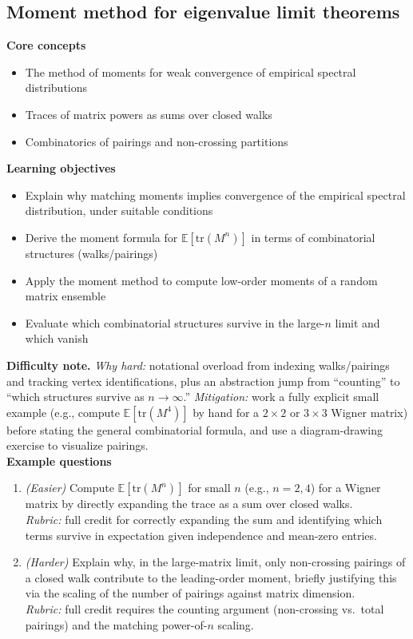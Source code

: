 \documentclass[11pt]{article}
\begin{document}
\subsection{Moment method for eigenvalue limit theorems}
\textbf{Core concepts}
\begin{itemize}[nosep]
\item The method of moments for weak convergence of empirical spectral distributions
\item Traces of matrix powers as sums over closed walks
\item Combinatorics of pairings and non-crossing partitions
\end{itemize}
\textbf{Learning objectives}
\begin{itemize}[nosep]
\item Explain why matching moments implies convergence of the empirical spectral distribution, under suitable conditions
\item Derive the moment formula for $\mathbb{E}[\mathrm{tr}(M^n)]$ in terms of combinatorial structures (walks/pairings)
\item Apply the moment method to compute low-order moments of a random matrix ensemble
\item Evaluate which combinatorial structures survive in the large-$n$ limit and which vanish
\end{itemize}
\textbf{Difficulty note.} \emph{Why hard:} notational overload from indexing walks/pairings and tracking vertex identifications, plus an abstraction jump from ``counting'' to ``which structures survive as $n \to \infty$.'' \emph{Mitigation:} work a fully explicit small example (e.g., compute $\mathbb{E}[\mathrm{tr}(M^4)]$ by hand for a $2\times2$ or $3\times3$ Wigner matrix) before stating the general combinatorial formula, and use a diagram-drawing exercise to visualize pairings.\\[4pt]
\textbf{Example questions}
\begin{enumerate}[nosep]
\item \emph{(Easier)} Compute $\mathbb{E}[\mathrm{tr}(M^n)]$ for small $n$ (e.g., $n=2,4$) for a Wigner matrix by directly expanding the trace as a sum over closed walks. \\
\emph{Rubric:} full credit for correctly expanding the sum and identifying which terms survive in expectation given independence and mean-zero entries.
\item \emph{(Harder)} Explain why, in the large-matrix limit, only non-crossing pairings of a closed walk contribute to the leading-order moment, briefly justifying this via the scaling of the number of pairings against matrix dimension. \\
\emph{Rubric:} full credit requires the counting argument (non-crossing vs.\ total pairings) and the matching power-of-$n$ scaling.
\end{enumerate}
\end{document}
